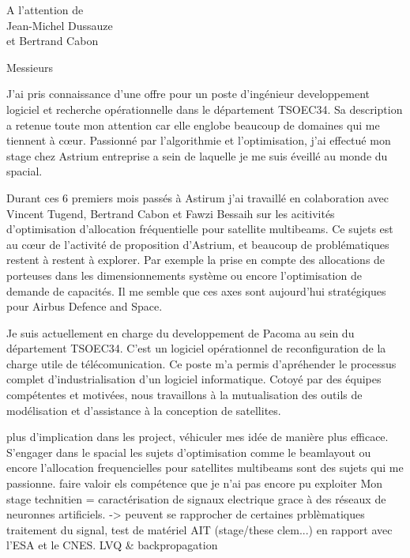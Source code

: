 \documentclass[12pt]{lettre}
\begin{document}
\begin{letter}{A l'attention de\\Jean-Michel Dussauze\\et Bertrand Cabon}
\address{Victor Cameo Ponz\\16 rue Payras\\31000 Toulouse}
\nofax

\opening{Messieurs}
J'ai pris connaissance d'une offre pour un poste d'ingénieur developpement logiciel et recherche opérationnelle dans le département TSOEC34.
Sa description a retenue toute mon attention car elle englobe beaucoup de domaines qui me tiennent à c\oe{}ur.
Passionné par l'algorithmie et l'optimisation, j'ai effectué mon stage chez Astrium entreprise a sein de laquelle je me suis éveillé au monde du spacial.

Durant ces 6 premiers mois passés à Astirum j'ai travaillé en colaboration
avec Vincent Tugend, Bertrand Cabon et Fawzi Bessaih sur les acitivités d'optimisation d'allocation fréquentielle pour satellite multibeams.
Ce sujets est au cœur de l'activité de proposition d'Astrium,
et beaucoup de problématiques restent à restent à explorer.
Par exemple la prise en compte des allocations de porteuses dans les
dimensionnements système ou encore l'optimisation de demande de capacités.
Il me semble que ces axes sont aujourd'hui stratégiques pour Airbus Defence and Space.

Je suis actuellement en charge du developpement de Pacoma au sein du département TSOEC34.
C'est un logiciel opérationnel de reconfiguration de la charge utile de télécomunication.
Ce poste m'a permis d'apréhender le processus complet d'industrialisation d'un logiciel informatique.
Cotoyé par des équipes compétentes et motivées, nous travaillons à la
mutualisation des outils de modélisation et d'assistance à la conception de satellites.

plus d'implication dans les project, véhiculer mes idée de manière plus efficace. S'engager dans le spacial
les sujets d'optimisation comme le beamlayout ou encore l'allocation frequencielles pour satellites multibeams sont des sujets qui me passionne.
faire valoir els compétence que je n'ai pas encore pu exploiter
Mon stage technitien = caractérisation de signaux electrique grace à des réseaux de neuronnes artificiels. -> peuvent se rapprocher de certaines prblèmatiques traitement du signal, test de matériel AIT (stage/these clem...) en rapport avec l'ESA et le CNES. LVQ \& backpropagation


\end{letter}
\end{document}
